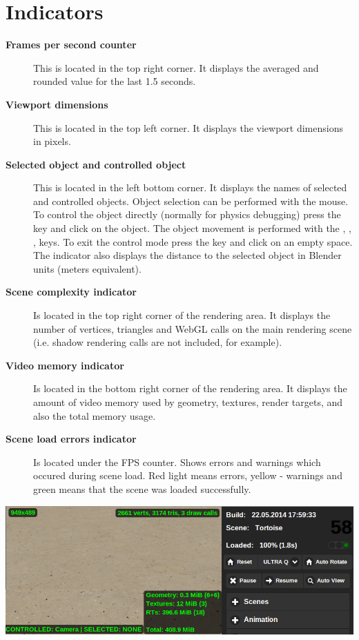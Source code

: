 \documentclass[a4paper,12pt,oneside]{sphinxmanual}
\begin{document}
\section{Indicators}
\label{viewer:id5}\begin{description}
\item[{\textbf{Frames per second counter}}] \leavevmode
This is located in the top right corner. It displays the averaged and rounded value for the last 1.5 seconds.

\item[{\textbf{Viewport dimensions}}] \leavevmode
This is located in the top left corner. It displays the viewport dimensions in pixels.

\item[{\textbf{Selected object and controlled object}}] \leavevmode
This is located in the left bottom corner. It displays the names of selected and controlled objects. Object selection can be performed with the mouse. To control the object directly (normally for physics debugging) press the  key and click on the object. The object movement is performed with the , , ,  keys. To exit the control mode press the  key and click on an empty space. The indicator also displays the distance to the selected object in Blender units (meters equivalent).

\item[{\textbf{Scene complexity indicator}}] \leavevmode
Is located in the top right corner of the rendering area. It displays the number of vertices, triangles and WebGL calls on the main rendering scene (i.e. shadow rendering calls are not included, for example).

\item[{\textbf{Video memory indicator}}] \leavevmode
Is located in the bottom right corner of the rendering area. It displays the amount of video memory used by geometry, textures, render targets, and also the total memory usage.

\item[{\textbf{Scene load errors indicator}}] \leavevmode
Is located under the FPS counter. Shows errors and warnings which occured during scene load. Red light means errors, yellow - warnings and green means that the scene was loaded successfully.

\end{description}

{\hfill\includegraphics[width=1.000\linewidth]{indicators.jpg}\hfill}
\end{document}
